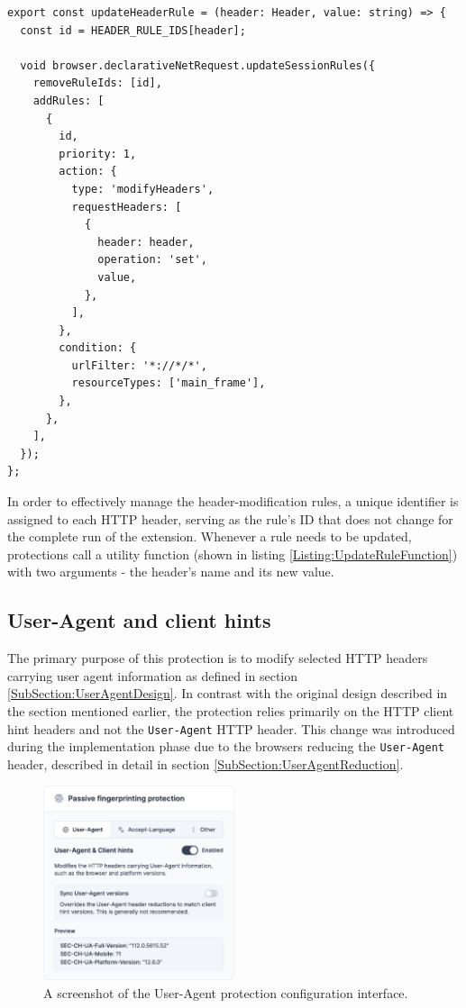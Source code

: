 \begin{lstlisting}[caption={A utility function that removes the old header-modification rule and defines a new one with a new value.}, label={Listing:UpdateRuleFunction}]
export const updateHeaderRule = (header: Header, value: string) => {
  const id = HEADER_RULE_IDS[header];

  void browser.declarativeNetRequest.updateSessionRules({
    removeRuleIds: [id],
    addRules: [
      {
        id,
        priority: 1,
        action: {
          type: 'modifyHeaders',
          requestHeaders: [
            {
              header: header,
              operation: 'set',
              value,
            },
          ],
        },
        condition: {
          urlFilter: '*://*/*',
          resourceTypes: ['main_frame'],
        },
      },
    ],
  });
};

\end{lstlisting}

\medbreak

In order to effectively manage the header-modification rules, a unique identifier is assigned to each HTTP header, serving as the rule's ID that does not change for the complete run of the extension. Whenever a rule needs to be updated, protections call a utility function (shown in listing \ref{Listing:UpdateRuleFunction}) with two arguments - the header's name and its new value.

\subsection{User-Agent and client hints}

The primary purpose of this protection is to modify selected HTTP headers carrying user agent information as defined in section \ref{SubSection:UserAgentDesign}. In contrast with the original design described in the section mentioned earlier, the protection relies primarily on the HTTP client hint headers and not the \texttt{User-Agent} HTTP header. This change was introduced during the implementation phase due to the browsers reducing the \texttt{User-Agent} header, described in detail in section \ref{SubSection:UserAgentReduction}.

\begin{figure}[H]
    \centering
    \includegraphics[width=0.5\textwidth]{obrazky-figures/screenshot-user-agent}
    \caption{A screenshot of the User-Agent protection configuration interface.}
\end{figure}

